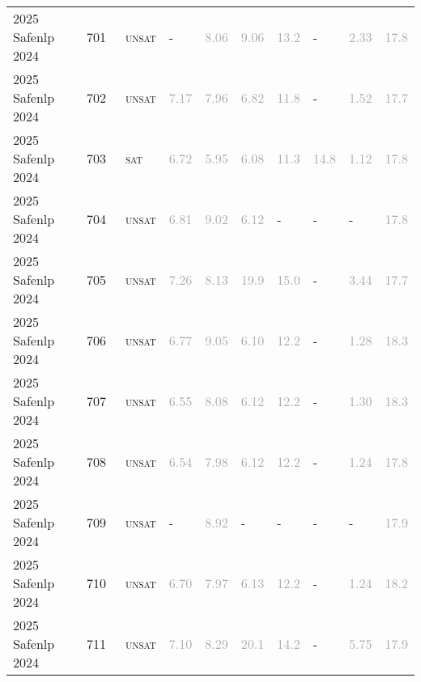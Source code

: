 \begin{center}
{\begin{longtable}{@{}llllllllll@{}}
2025 Safenlp 2024 & 701 & ~\textsc{unsat} & - & \textcolor{darkgray}{8.06} & \textcolor{darkgray}{9.06} & \textcolor{darkgray}{13.2} & - & \textcolor{darkgray}{2.33} & \textcolor{darkgray}{17.8} \\
2025 Safenlp 2024 & 702 & ~\textsc{unsat} & \textcolor{darkgray}{7.17} & \textcolor{darkgray}{7.96} & \textcolor{darkgray}{6.82} & \textcolor{darkgray}{11.8} & - & \textcolor{darkgray}{1.52} & \textcolor{darkgray}{17.7} \\
2025 Safenlp 2024 & 703 & ~\textsc{sat} & \textcolor{darkgray}{6.72} & \textcolor{darkgray}{5.95} & \textcolor{darkgray}{6.08} & \textcolor{darkgray}{11.3} & \textcolor{darkgray}{14.8} & \textcolor{darkgray}{1.12} & \textcolor{darkgray}{17.8} \\
2025 Safenlp 2024 & 704 & ~\textsc{unsat} & \textcolor{darkgray}{6.81} & \textcolor{darkgray}{9.02} & \textcolor{darkgray}{6.12} & - & - & - & \textcolor{darkgray}{17.8} \\
2025 Safenlp 2024 & 705 & ~\textsc{unsat} & \textcolor{darkgray}{7.26} & \textcolor{darkgray}{8.13} & \textcolor{darkgray}{19.9} & \textcolor{darkgray}{15.0} & - & \textcolor{darkgray}{3.44} & \textcolor{darkgray}{17.7} \\
2025 Safenlp 2024 & 706 & ~\textsc{unsat} & \textcolor{darkgray}{6.77} & \textcolor{darkgray}{9.05} & \textcolor{darkgray}{6.10} & \textcolor{darkgray}{12.2} & - & \textcolor{darkgray}{1.28} & \textcolor{darkgray}{18.3} \\
2025 Safenlp 2024 & 707 & ~\textsc{unsat} & \textcolor{darkgray}{6.55} & \textcolor{darkgray}{8.08} & \textcolor{darkgray}{6.12} & \textcolor{darkgray}{12.2} & - & \textcolor{darkgray}{1.30} & \textcolor{darkgray}{18.3} \\
2025 Safenlp 2024 & 708 & ~\textsc{unsat} & \textcolor{darkgray}{6.54} & \textcolor{darkgray}{7.98} & \textcolor{darkgray}{6.12} & \textcolor{darkgray}{12.2} & - & \textcolor{darkgray}{1.24} & \textcolor{darkgray}{17.8} \\
2025 Safenlp 2024 & 709 & ~\textsc{unsat} & - & \textcolor{darkgray}{8.92} & - & - & - & - & \textcolor{darkgray}{17.9} \\
2025 Safenlp 2024 & 710 & ~\textsc{unsat} & \textcolor{darkgray}{6.70} & \textcolor{darkgray}{7.97} & \textcolor{darkgray}{6.13} & \textcolor{darkgray}{12.2} & - & \textcolor{darkgray}{1.24} & \textcolor{darkgray}{18.2} \\
2025 Safenlp 2024 & 711 & ~\textsc{unsat} & \textcolor{darkgray}{7.10} & \textcolor{darkgray}{8.29} & \textcolor{darkgray}{20.1} & \textcolor{darkgray}{14.2} & - & \textcolor{darkgray}{5.75} & \textcolor{darkgray}{17.9} \\

\end{longtable}}
\end{center}
